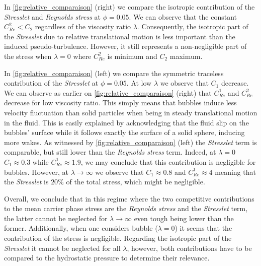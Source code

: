 In \ref{fig:relative_comparaison} (right) we compare the isotropic contribution of the \textit{Stresslet} and \textit{Reynolds stress} at $\phi =0.05$. 
We can observe that the constant $C_{Re}^2 < C_2$ regardless of the viscosity ratio $\lambda$. 
Consequently, the isotropic part of the \textit{Stresslet} due to relative translational motion is less important than the induced pseudo-turbulence.
However, it still represents a non-negligible part of the stress when $\lambda = 0$ where $C_{Re}^2$ is minimum and $C_2$ maximum. 


In \ref{fig:relative_comparaison} (left) we compare the symmetric traceless contribution of the \textit{Stresslet} at $\phi =0.05$. 
At low $\lambda$ we observe that $C_1$ decrease. 
We can observe as earlier on \ref{fig:relative_comparaison} (right) that $C_{Re}^1$ and $C_{Re}^2$ decrease for low viscosity ratio. 
This simply means that bubbles induce less velocity fluctuation than solid particles when being in steady translational motion in the fluid. 
This is easily explained by acknowledging that the fluid slip on the bubbles' surface while it follows exactly the surface of a solid sphere, inducing more wakes. 
As witnessed by \ref{fig:relative_comparaison} (left) the \textit{Stresslet} term is comparable, but still lower than the \textit{Reynolds stress} term.
Indeed, at $\lambda = 0$ $C_1 \approx 0.3$ while $C^1_{Re} \approx 1.9$, we may conclude that this contribution is negligible for bubbles.
However, at $\lambda \to \infty$ we observe that $C_1 \approx 0.8$ and $C^1_{Re}\approx 4$ meaning that the \textit{Stresslet} is $20\%$ of the total stress, which might be negligible.  

Overall, we conclude that in this regime where the two competitive contributions to the mean carrier phase stress are the \textit{Reynolds stress} and the \textit{Stresslet} term, the latter cannot be neglected for $\lambda \to \infty$ even tough being lower than the former. 
Additionally, when one considers bubble ($\lambda=0$) it seems that the contribution of the stress is negligible. 
Regarding the isotropic part of the \textit{Stresslet} it cannot be neglected for all $\lambda$, however, both contributions have to be compared to the hydrostatic pressure to determine their relevance. 